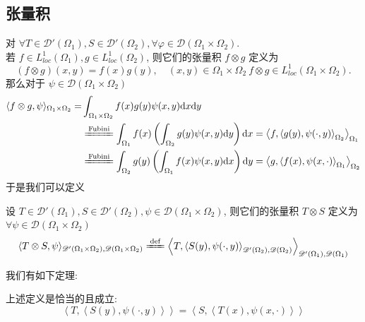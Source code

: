 \documentclass[11pt]{ctexart}[UTF8]
\begin{document}
\subsection{张量积}
对 $\forall T \in \mathscr{D}'(\Omega_{1}), S \in \mathscr{D}'(\Omega_{2}), \forall \varphi \in \mathscr{D}(\Omega_{1} \times \Omega_{2})$.\\
若 $f \in L_{loc}^1(\Omega_1), g \in L_{loc}^1(\Omega_2)$, 则它们的张量积 $f \otimes g$ 定义为
\begin{equation*}
    (f \otimes g)(x,y) = f(x)g(y), \quad (x,y) \in \Omega_1 \times \Omega_2 \ f \otimes g \in L_{loc}^1(\Omega_1 \times \Omega_2).
\end{equation*}
那么对于 $\psi \in \mathscr{D}(\Omega_1 \times \Omega_2)$
\begin{equation*}
    \begin{aligned}
        \langle f \otimes g, \psi \rangle_{\Omega_1 \times \Omega_2} = & \int_{\Omega_1 \times \Omega_2} f(x)g(y)\psi(x,y) \mathrm{d}x \mathrm{d}y\\
        & \xlongequal{\text{Fubini}}  \int_{\Omega_1} f(x) \left( \int_{\Omega_2} g(y)\psi(x,y) \mathrm{d}y\right) \mathrm{d}x = \left\langle f, \left\langle g(y), \psi(\cdot,y) \right\rangle_{\Omega_2} \right\rangle_{\Omega_1}\\
        & \xlongequal{\text{Fubini}}  \int_{\Omega_2} g(y) \left( \int_{\Omega_1} f(x)\psi(x,y) \mathrm{d}x\right) \mathrm{d}y = \left\langle g, \left\langle f(x), \psi(x,\cdot) \right\rangle_{\Omega_1} \right\rangle_{\Omega_2}
    \end{aligned}
\end{equation*}
于是我们可以定义
\begin{definition}
    设 $T \in \mathscr{D}'(\Omega_1), S \in \mathscr{D}'(\Omega_2), \psi \in \mathscr{D}(\Omega_1 \times \Omega_2)$, 则它们的张量积 $T \otimes S$ 定义为 $\forall \psi \in \mathscr{D}(\Omega_1 \times \Omega_2)$
    \begin{equation}\label{definition of tensor pprduct}
        \langle T \otimes S, \psi \rangle_{\mathscr{D}'(\Omega_1 \times \Omega_2), \mathscr{D}(\Omega_1 \times \Omega_2)} \xlongequal{\mathrm{def}} \left\langle T, \left\langle S(y), \psi(\cdot,y) \right\rangle_{\mathscr{D}'(\Omega_2), \mathscr{D}(\Omega_2)} \right\rangle_{\mathscr{D}'(\Omega_1), \mathscr{D}(\Omega_1)} 
    \end{equation}
\end{definition}
我们有如下定理:
\begin{theorem}
    上述定义是恰当的且成立:
    \begin{equation}\label{exchange formula}
        \left\langle T, \left\langle S(y), \psi(\cdot,y) \right\rangle \right\rangle = \left\langle S, \left\langle T(x), \psi(x,\cdot) \right\rangle \right\rangle
    \end{equation}
\end{theorem}
\end{document}
